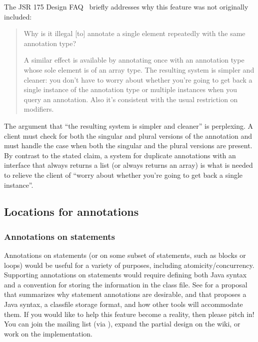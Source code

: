 \documentclass[10pt]{article}
\begin{document}
The JSR 175 Design FAQ~\cite{JSR175-PFD2} briefly addresses why this
feature was not originally included:

\begin{quote}
Why is it illegal [to] annotate a single element repeatedly with the same annotation type?

A similar effect is available by annotating once with an annotation type
whose sole element is of an array type. The resulting system is simpler and
cleaner: you don't have to worry about whether you're going to get back a
single instance of the annotation type or multiple instances when you query
an annotation. Also it's consistent with the usual restriction on
modifiers.
\end{quote}

The argument that ``the resulting system is simpler and cleaner'' is
perplexing.  A client must check for both the singular and plural versions
of the annotation and must handle the case when both the singular and the
plural versions are present.  By contrast to the stated claim, a system for
duplicate annotations with an interface that always returns a list (or
always returns an array) is what is needed to relieve the client of ``worry
about whether you're going to get back a single instance''.


\subsection{Locations for annotations\label{locations-for-annotations}}


\subsubsection{Annotations on statements\label{statement-annotations}}

Annotations on statements (or on some subset of statements, such as blocks
or loops) would be useful for a variety of purposes, including
atomicity/concurrency.  Supporting annotations on statements would require
defining both Java syntax and a convention for storing the information in
the class file.  See
 for a
proposal that summarizes why statement annotations are desirable, and that
proposes a Java syntax, a classfile storage format, and how other tools
will accommodate them.  If you would like to help this feature become a
reality, then please pitch in!  You can join the
 mailing list (via
),
expand the partial design on the wiki, or work on the implementation.
\end{document}

